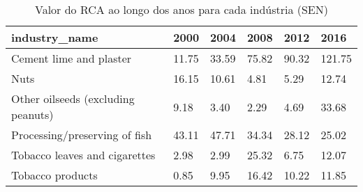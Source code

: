 \begin{table}
\centering
\caption{Valor do RCA ao longo dos anos para cada indústria (SEN)}
\begin{tabular}{p{6cm}p{1.5cm}p{1.5cm}p{1.5cm}p{1.5cm}p{1.5cm}}
\toprule
                     industry\_name &  2000 &  2004 &  2008 &  2012 &   2016 \\
\midrule
           Cement lime and plaster & 11.75 & 33.59 & 75.82 & 90.32 & 121.75 \\
                              Nuts & 16.15 & 10.61 &  4.81 &  5.29 &  12.74 \\
Other oilseeds (excluding peanuts) &  9.18 &  3.40 &  2.29 &  4.69 &  33.68 \\
     Processing/preserving of fish & 43.11 & 47.71 & 34.34 & 28.12 &  25.02 \\
     Tobacco leaves and cigarettes &  2.98 &  2.99 & 25.32 &  6.75 &  12.07 \\
                  Tobacco products &  0.85 &  9.95 & 16.42 & 10.22 &  11.85 \\
\bottomrule
\end{tabular}
\end{table}
